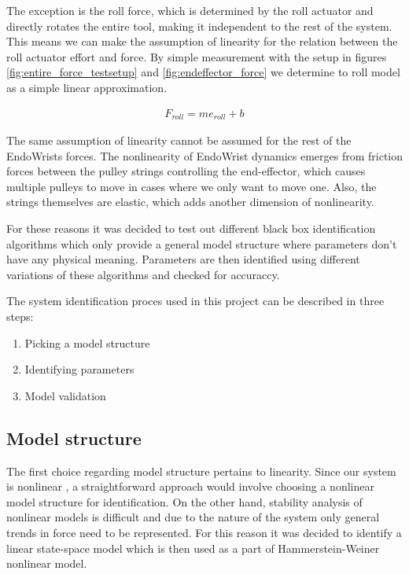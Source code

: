 The exception is the roll force, which is determined by the roll actuator and directly rotates the entire tool, making it independent to the rest of the system.
This means we can make the assumption of linearity for the relation between the roll actuator effort and force.  
By simple measurement with the setup in figures \ref{fig:entire_force_testsetup} and \ref{fig:endeffector_force} we determine to roll model as a simple
linear approximation.

\begin{align}
F_{roll} = m e_{roll} + b
\end{align}

The same assumption of linearity cannot be assumed for the rest of the EndoWrists forces.
The nonlinearity of EndoWrist dynamics emerges from friction forces between the pulley strings controlling the end-effector, which causes multiple pulleys to move in cases where we only want to move one. 
Also, the strings themselves are elastic, which adds another dimension of nonlinearity.

For these reasons it was decided to test out different black box identification algorithms which only provide a general model structure where parameters don't have any physical meaning. Parameters are then identified using different variations of these algorithms and checked for accuraccy.

The system identification proces used in this project can be described in three steps:
\begin{enumerate}
\item Picking a model structure
\item Identifying parameters
\item Model validation
\end{enumerate}

\subsection{Model structure}
The first choice regarding model structure pertains to linearity.
Since our system is nonlinear , a straightforward approach would involve choosing a nonlinear model structure for identification.
On the other hand, stability analysis of nonlinear models is difficult and due to the nature of the system only general trends in force need to be represented.
For this reason it was decided to identify a linear state-space model which is then used as a part of Hammerstein-Weiner nonlinear model.

